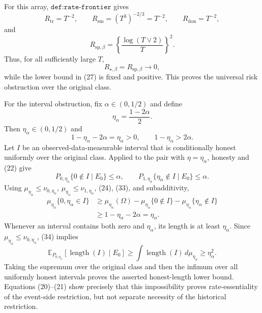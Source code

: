For this array, \(\texttt{def:rate-frontier}\) gives
\[
R_{\mathrm{tr}}=T^{-2},
\qquad
R_{\mathrm{sm}}=(T^3)^{-2/3}=T^{-2},
\qquad
R_{\mathrm{don}}=T^{-2},
\tag{28}
\]
and
\[
R_{\mathrm{sp},\beta}
=\left\{\frac{\log(T\vee2)}T\right\}^{2}.
\tag{29}
\]
Thus, for all sufficiently large \(T\),
\[
R_{\star,\beta}=R_{\mathrm{sp},\beta}\longrightarrow0,
\tag{30}
\]
while the lower bound in (27) is fixed and positive.  This proves the universal risk obstruction over the original class.

For the interval obstruction, fix \(\alpha\in(0,1/2)\) and define
\[
\eta_\alpha=\frac{1-2\alpha}{2}.
\tag{31}
\]
Then \(\eta_\alpha\in(0,1/2)\) and
\[
1-\eta_\alpha-2\alpha=\eta_\alpha>0,
\qquad
1-\eta_\alpha>2\alpha.
\tag{32}
\]
Let \(I\) be an observed-data-measurable interval that is conditionally honest uniformly over the original class.  Applied to the pair with \(\eta=\eta_\alpha\), honesty and (22) give
\[
P_{0,\eta_\alpha}\{0\notin I\mid E_0\}\le\alpha,
\qquad
P_{1,\eta_\alpha}\{\eta_\alpha\notin I\mid E_0\}\le\alpha.
\tag{33}
\]
Using \(\mu_{\eta_\alpha}\le\nu_{0,\eta_\alpha}\), \(\mu_{\eta_\alpha}\le\nu_{1,\eta_\alpha}\), (24), (33), and subadditivity,
\[
\begin{aligned}
\mu_{\eta_\alpha}\{0,\eta_\alpha\in I\}
&\ge \mu_{\eta_\alpha}(\Omega)
-\mu_{\eta_\alpha}\{0\notin I\}
-\mu_{\eta_\alpha}\{\eta_\alpha\notin I\}\\
&\ge1-\eta_\alpha-2\alpha
=\eta_\alpha.
\end{aligned}
\tag{34}
\]
Whenever an interval contains both zero and \(\eta_\alpha\), its length is at least \(\eta_\alpha\).  Since \(\mu_{\eta_\alpha}\le\nu_{0,\eta_\alpha}\), (34) implies
\[
\mathbb E_{P_{0,\eta_\alpha}}[\operatorname{length}(I)\mid E_0]
\ge\int\operatorname{length}(I)\,d\mu_{\eta_\alpha}
\ge\eta_\alpha^2.
\tag{35}
\]
Taking the supremum over the original class and then the infimum over all uniformly honest intervals proves the asserted honest-length lower bound.  Equations (20)--(21) show precisely that this impossibility proves rate-essentiality of the event-side restriction, but not separate necessity of the historical restriction.

